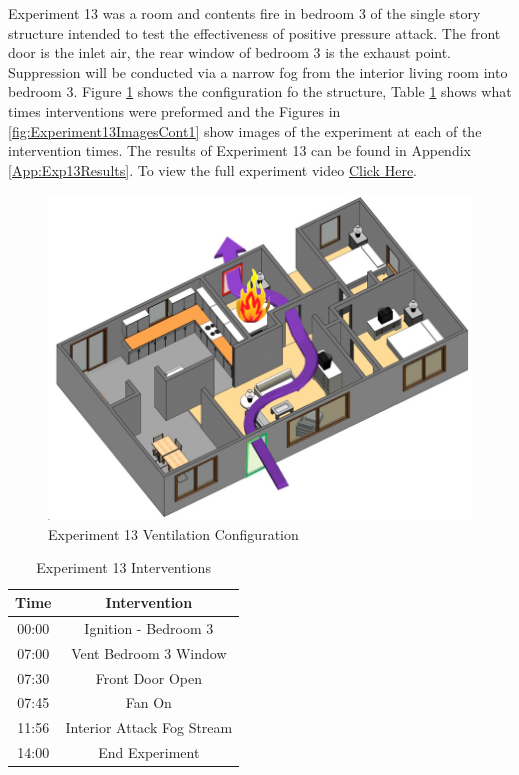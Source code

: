 \documentclass{article}
\begin{document}
Experiment 13 was a room and contents fire in bedroom 3 of the single story structure intended to test the effectiveness of positive pressure attack. The front door is the inlet air, the rear window of bedroom 3 is the exhaust point. Suppression will be conducted via a narrow fog from the interior living room into bedroom 3. Figure \ref{fig:Exp13VentConfig} shows the configuration fo the structure, Table \ref{Table:Exp13Interventions} shows what times interventions were preformed and the Figures in \ref{fig:Experiment13ImagesCont1} show images of the experiment at each of the intervention times. The results of Experiment 13 can be found in Appendix \ref{App:Exp13Results}. To view the full experiment video \href{https://youtu.be/bMQUpJWIFus}{Click Here}.

\begin{figure}[H]
	\centering
	\includegraphics[width=5in]{0_Images/FireExperiments/Single_Story/Experiment_13.jpg}
	\caption{Experiment 13 Ventilation Configuration}
	\label{fig:Exp13VentConfig}
\end{figure}

\begin{table}[H]
	\centering
	\caption{Experiment 13 Interventions}
	\begin{tabular}{|c|c|} 
		\hline
		Time & Intervention \\ \hline \hline
		00:00 & Ignition - Bedroom 3\\ \hline
		07:00 & Vent Bedroom 3 Window \\ \hline
		07:30 & Front Door Open \\ \hline
		07:45 & Fan On \\ \hline
		11:56 & Interior Attack Fog Stream \\ \hline
		14:00 & End Experiment \\ \hline
	\end{tabular}
	\label{Table:Exp13Interventions}
\end{table}
\end{document}
